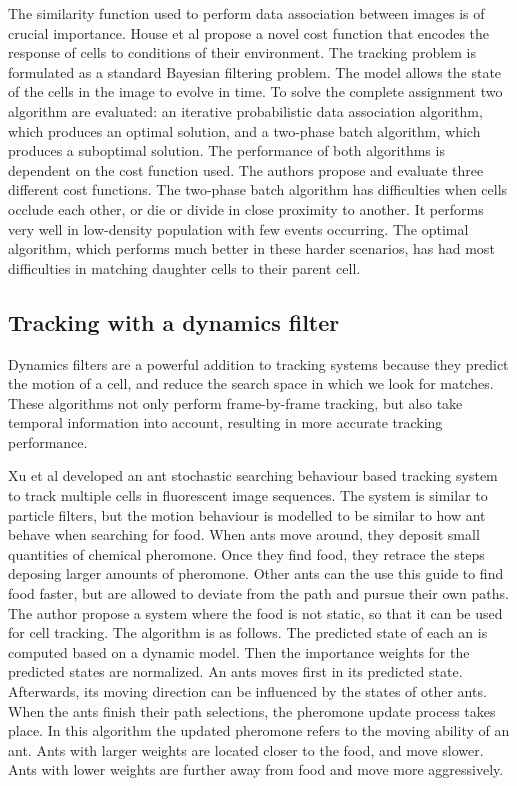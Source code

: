 \documentclass[12pt,a4paper,openany]{book}
\begin{document}
The similarity function used to perform data association between images is of crucial importance. House et al \cite{house09} propose a novel cost function that encodes the response of cells to conditions of their environment. The tracking problem is formulated as a standard Bayesian filtering problem. The model allows the state of the cells in the image to evolve in time. To solve the complete assignment two algorithm are evaluated: an iterative probabilistic data association algorithm, which produces an optimal solution, and a two-phase batch algorithm, which produces a suboptimal solution. The performance of both algorithms is dependent on the cost function used. The authors propose and evaluate three different cost functions. The two-phase batch algorithm has difficulties when cells occlude each other, or die or divide in close proximity to another. It performs very well in low-density population with few events occurring. The optimal algorithm, which performs much better in these harder scenarios, has had most difficulties in matching daughter cells to their parent cell.


\subsection{Tracking with a dynamics filter}

Dynamics filters are a powerful addition to tracking systems because they predict the motion of a cell, and reduce the search space in which we look for matches. These algorithms not only perform frame-by-frame tracking, but also take temporal information into account, resulting in more accurate tracking performance.

Xu et al \cite{xu12} developed an ant stochastic searching behaviour based tracking system to track multiple cells in fluorescent image sequences. The system is similar to particle filters, but the motion behaviour is modelled to be similar to how ant behave when searching for food. When ants move around, they deposit small quantities of chemical pheromone. Once they find food, they retrace the steps deposing larger amounts of pheromone. Other ants can the use this guide to find food faster, but are allowed to deviate from the path and pursue their own paths. The author propose a system where the food is not static, so that it can be used for cell tracking. The algorithm is as follows. The predicted state of each an is computed based on a dynamic model. Then the importance weights for the predicted states are normalized. An ants moves first in its predicted state. Afterwards, its moving direction can be influenced by the states of other ants. When the ants finish their path selections, the pheromone update process takes place. In this algorithm the updated pheromone refers to the moving ability of an ant. Ants with larger weights are located closer to the food, and move slower. Ants with lower weights are further away from food and move more aggressively.
\end{document}
